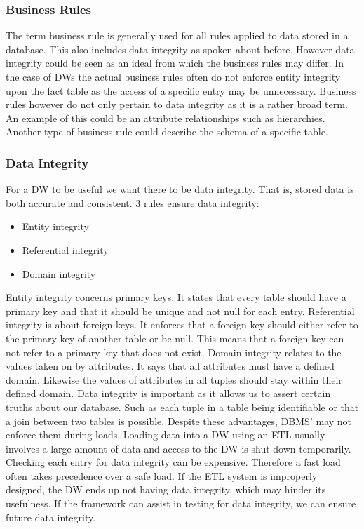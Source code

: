 \subsubsection{Business Rules}
The term business rule is generally used for all rules applied to data stored in a database. This also includes data integrity as spoken about before. However data integrity could be seen as an ideal from which the business rules may differ. In the case of DWs the actual business rules often do not enforce entity integrity upon the fact table as the access of a specific entry may be unnecessary. Business rules however do not only pertain to data integrity as it is a rather broad term. An example of this could be an attribute relationships such as hierarchies. Another type of business rule could describe the schema of a specific table.

\subsubsection{Data Integrity}
For a DW to be useful we want there to be data integrity. That is, stored data is both accurate and consistent. 3 rules ensure data integrity:

\begin{itemize}
\item Entity integrity
\item Referential integrity
\item Domain integrity
\end{itemize}

Entity integrity concerns primary keys. It states that every table should have a primary key and that it should be unique and not null for each entry. Referential integrity is about foreign keys. It enforces that a foreign key should either refer to the primary key of another table or be null. This means that a foreign key can not refer to a primary key that does not exist. Domain integrity relates to the values taken on by attributes. It says that all attributes must have a defined domain. Likewise the values of attributes in all tuples should stay within their defined domain. Data integrity is important as it allows us to assert certain truths about our database. Such as each tuple in a table being identifiable or that a join between two tables is possible. Despite these advantages, DBMS' may not enforce them during loads. Loading data into a DW using an ETL usually involves a large amount of data and access to the DW is shut down temporarily. Checking each entry for data integrity can be expensive. Therefore a fast load often takes precedence over a safe load. If the ETL system is improperly designed, the DW ends up not having data integrity, which may hinder its usefulness. If the framework can assist in testing for data integrity, we can ensure future data integrity.

